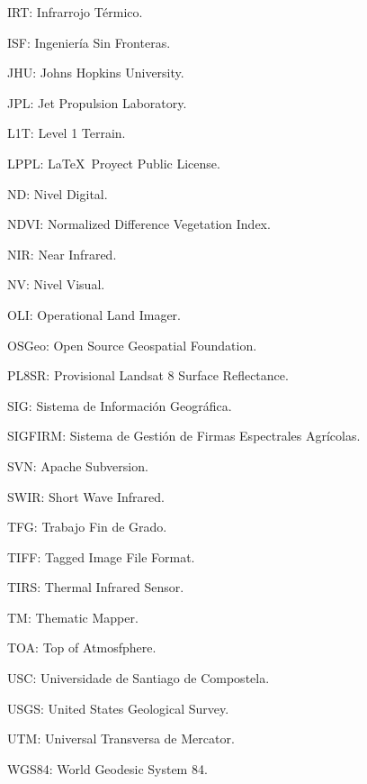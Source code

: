 IRT: Infrarrojo Térmico.

ISF: Ingeniería Sin Fronteras.

JHU: Johns Hopkins University.

JPL: Jet Propulsion Laboratory.

L1T: Level 1 Terrain.

LPPL: \LaTeX\ Proyect Public License.

ND: Nivel Digital.

NDVI: Normalized Difference Vegetation Index.

NIR: Near Infrared.

NV: Nivel Visual.

OLI: Operational Land Imager.

OSGeo: Open Source Geospatial Foundation.

PL8SR: Provisional Landsat 8 Surface Reflectance.

SIG: Sistema de Información Geográfica.

SIGFIRM: Sistema de Gestión de Firmas Espectrales Agrícolas.

SVN: Apache Subversion.

SWIR: Short Wave Infrared.

TFG: Trabajo Fin de Grado.

TIFF: Tagged Image File Format.

TIRS: Thermal Infrared Sensor.

TM: Thematic Mapper.

TOA: Top of Atmosfphere.

USC: Universidade de Santiago de Compostela.

USGS: United States Geological Survey.

UTM: Universal Transversa de Mercator.

WGS84: World Geodesic System 84.